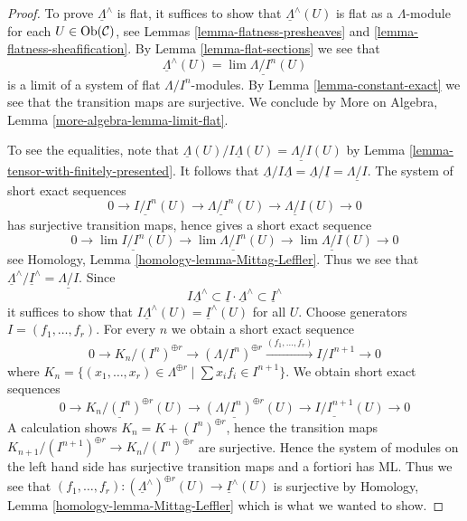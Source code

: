 \begin{proof}
To prove $\underline{\Lambda}^\wedge$ is flat, it suffices to show that
$\underline{\Lambda}^\wedge(U)$ is flat as a $\Lambda$-module for each
$U \in \mathop{\mathrm{Ob}}\nolimits(\mathcal{C})$, see
Lemmas \ref{lemma-flatness-presheaves} and
\ref{lemma-flatness-sheafification}.
By Lemma \ref{lemma-flat-sections} we see that
$$
\underline{\Lambda}^\wedge(U) = \lim \underline{\Lambda/I^n}(U)
$$
is a limit of a system of flat $\Lambda/I^n$-modules.
By Lemma \ref{lemma-constant-exact} we see that the transition maps
are surjective. We conclude by
More on Algebra, Lemma \ref{more-algebra-lemma-limit-flat}.

\medskip\noindent
To see the equalities, note that
$\underline{\Lambda}(U)/I\underline{\Lambda}(U) = \underline{\Lambda/I}(U)$
by Lemma \ref{lemma-tensor-with-finitely-presented}.
It follows that $\underline{\Lambda}/I\underline{\Lambda} =
\underline{\Lambda}/\underline{I} = \underline{\Lambda/I}$. The system
of short exact sequences
$$
0 \to \underline{I/I^n}(U) \to \underline{\Lambda/I^n}(U) \to
\underline{\Lambda/I}(U) \to 0
$$
has surjective transition maps, hence gives a short exact sequence
$$
0 \to \lim \underline{I/I^n}(U) \to \lim \underline{\Lambda/I^n}(U) \to
\lim \underline{\Lambda/I}(U) \to 0
$$
see Homology, Lemma \ref{homology-lemma-Mittag-Leffler}. Thus we see that
$\underline{\Lambda}^\wedge/\underline{I}^\wedge =
\underline{\Lambda/I}$. Since
$$
I \underline{\Lambda}^\wedge \subset
\underline{I} \cdot \underline{\Lambda}^\wedge \subset
\underline{I}^\wedge
$$
it suffices to show that
$I \underline{\Lambda}^\wedge(U) = \underline{I}^\wedge(U)$
for all $U$. Choose generators $I = (f_1, \ldots, f_r)$.
For every $n$ we obtain a short exact sequence
$$
0 \to K_n/(I^n)^{\oplus r} \to (\Lambda/I^n)^{\oplus r}
\xrightarrow{(f_1, \ldots, f_r)}
I/I^{n + 1} \to 0
$$
where $K_n =
\{(x_1, \ldots, x_r) \in \Lambda^{\oplus r} \mid \sum x_i f_i \in I^{n + 1}\}$.
We obtain short exact sequences
$$
0 \to \underline{K_n/(I^n)^{\oplus r}}(U) \to
\underline{(\Lambda/I^n)^{\oplus r}}(U) \to
\underline{I/I^{n + 1}}(U) \to 0
$$
A calculation shows $K_n = K + (I^n)^{\oplus r}$, hence
the transition maps
$K_{n + 1}/(I^{n + 1})^{\oplus r} \to K_n/(I^n)^{\oplus r}$ are surjective.
Hence the system of modules on the left hand side has surjective transition
maps and a fortiori has ML. Thus we see that
$(f_1, \ldots, f_r) :
(\underline{\Lambda}^\wedge)^{\oplus r}(U) \to \underline{I}^\wedge(U)$
is surjective by
Homology, Lemma \ref{homology-lemma-Mittag-Leffler}
which is what we wanted to show.
\end{proof}

